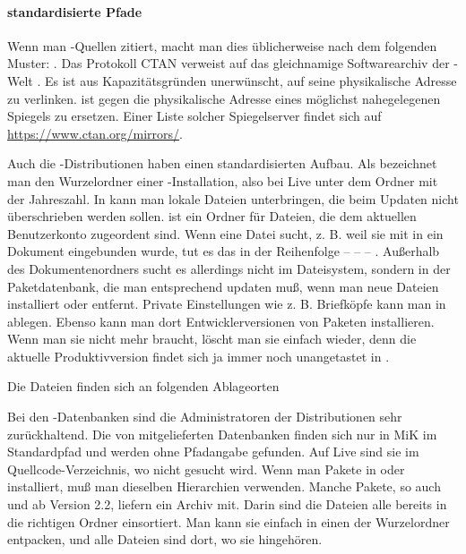 \documentclass[
	11pt,        %
	table,       %
	twoside,     %
	notitlepage, %
]{scrreprt}
\begin{document}
\paragraph{standardisierte Pfade}
Wenn man \TeXi-Quellen zitiert, macht man dies üblicherweise nach dem folgenden Muster: . Das Protokoll CTAN verweist auf das gleichnamige Softwarearchiv der \TeXi-Welt . Es ist aus Kapazitätsgründen unerwünscht, auf seine physikalische Adresse zu verlinken.  ist gegen die physikalische Adresse eines möglichst nahegelegenen Spiegels zu ersetzen. Einer Liste solcher Spiegelserver findet sich auf \url{https://www.ctan.org/mirrors/}.

Auch die \TeXi-Distributionen haben einen standardisierten Aufbau. Als  bezeichnet man den Wurzelordner einer \TeXi-Installation, also bei \TeXi{} Live unter dem Ordner mit der Jahreszahl. In  kann man lokale Dateien unterbringen, die beim Updaten nicht überschrieben werden sollen.  ist ein Ordner für Dateien, die dem aktuellen Benutzerkonto zugeordent sind. Wenn \LaTeXi{} eine Datei sucht, z. B. weil sie mit  in ein Dokument eingebunden wurde, tut es das in der Reihenfolge  –  –  – . Außerhalb des Dokumentenordners sucht es allerdings nicht im Dateisystem, sondern in der Paketdatenbank, die man entsprechend updaten muß, wenn man neue Dateien installiert oder entfernt. Private Einstellungen wie z. B. Briefköpfe kann man in  ablegen. Ebenso kann man dort Entwicklerversionen von Paketen installieren. Wenn man sie nicht mehr braucht, löscht man sie einfach wieder, denn die aktuelle Produktivversion findet sich ja immer noch unangetastet in .

Die Dateien finden sich an folgenden Ablageorten

Bei den \BibTeX-Datenbanken sind die Administratoren der Distributionen sehr zurückhaltend. Die von \archbib{} mitgelieferten Datenbanken finden sich nur in MiK\TeXi{} im Standardpfad und werden ohne Pfadangabe gefunden. Auf \TeXi{} Live sind sie im Quellcode-Verzeichnis, wo nicht gesucht wird. Wenn man Pakete in  oder  installiert, muß man dieselben Hierarchien verwenden. Manche Pakete, so auch \blx{} und \archbib{} ab Version 2.2, liefern ein Archiv  mit. Darin sind die Dateien alle bereits in die richtigen Ordner einsortiert. Man kann sie einfach in einen der Wurzelordner entpacken, und alle Dateien sind dort, wo sie hingehören.
\end{document}

